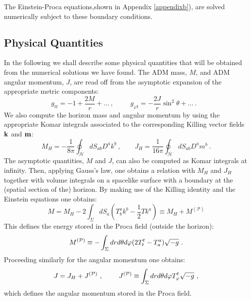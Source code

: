 The Einstein-Proca equations,shown in Appendix \ref{appendixb}), are solved numerically subject to these boundary conditions.


\subsection{Physical Quantities}
\label{subsec_II}
In the following we shall describe some physical quantities that will be obtained from the numerical solutions we have found.
The ADM mass, $M$, and ADM angular momentum, $J$, are read off from the asymptotic expansion of the appropriate metric components:
%
\begin{equation}
\label{Pasym}
g_{tt} =-1+\frac{2M}{r}+\dots \ ,\qquad ~~g_{\varphi t}=-\frac{2J}{r}\sin^2\theta+\dots \ . \ \ \ 
\end{equation}
%
We also compute the horizon mass and angular momentum by using the appropriate Komar integrals associated to the corresponding Killing vector fields ${\bf k}$ and ${\bf m}$:
\begin{equation}
M_H=-\frac{1}{8\pi}\oint_{\mathcal{H}}dS_{ab}D^a k^b \ , \qquad 
J_H=\frac{1}{16\pi}\oint_{\mathcal{H}}dS_{ab}D^a m^b \ .
\end{equation}
%
The asymptotic quantities, $M$ and $J$, can also be computed as Komar integrals at infinity.
Then, applying Gauss's law, one obtains a relation with $M_H$ and $J_H$ together with volume integrals on a spacelike surface with a boundary at the (spatial section of the) horizon.
By making use of the Killing identity and the Einstein equations one obtains:
\begin{equation}
M=M_H-2\int_{\Sigma}dS_{a}\left(T^a_b k^b-\frac{1}{2}Tk^a\right) \equiv M_H+M^{(\mathcal{P})}
\end{equation}
This defines the energy stored in the Proca field (outside the horizon):
\begin{equation}
M^{({\cal P})}\equiv - \int_{\Sigma} dr d\theta d\varphi(2T_t^t-T_a^a) \sqrt{-g} \ .
\label{ed}
\end{equation}
%
Proceeding similarly for the angular momentum one obtains:
\begin{equation}
J=J_H+J^{(\mathcal{P})} \ , \ \qquad  J^{({\cal P})}\equiv  \int_{\Sigma} dr d\theta d\varphi T^t_\varphi \sqrt{-g} \ ,
\label{amd}
\end{equation}
which defines the angular momentum stored in the Proca field.
